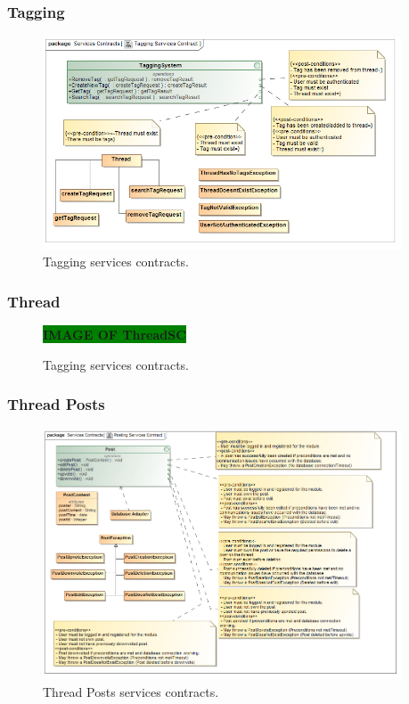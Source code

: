 \documentclass [a4paper,12pt] {article}
\begin{document}
		\subsubsection{Tagging}
			\begin{figure}[H]
				\centering
				\includegraphics[width=0.95\textwidth]{TaggingSC.png}
				\caption{Tagging services contracts.}
			\end{figure}
		\subsubsection{Thread}
			\begin{figure}[H]
				\centering
				\large\textbf{\colorbox{green}{IMAGE OF ThreadSC}}
				\caption{Tagging services contracts.}
			\end{figure}	
		\subsubsection{Thread Posts}
		\begin{figure}[H]
			\centering
			\includegraphics[width=0.95\textwidth]{ThreadPostsSC.png}
			\caption{Thread Posts services contracts.}
		\end{figure}	
\end{document}
